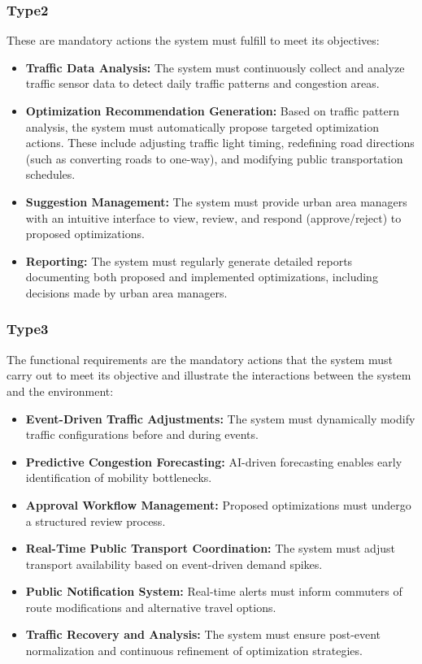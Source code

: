 \documentclass[a4paper,12pt]{article}
\begin{document}
\subsubsection*{Type2}
These are mandatory actions the system must fulfill to meet its objectives:
\begin{itemize}
    \item \textbf{Traffic Data Analysis:}  
    The system must continuously collect and analyze traffic sensor data to detect daily traffic patterns and congestion areas.

    \item \textbf{Optimization Recommendation Generation:}  
    Based on traffic pattern analysis, the system must automatically propose targeted optimization actions. These include adjusting traffic light timing, redefining road directions (such as converting roads to one-way), and modifying public transportation schedules.

    \item \textbf{Suggestion Management:}  
    The system must provide urban area managers with an intuitive interface to view, review, and respond (approve/reject) to proposed optimizations.

    \item \textbf{Reporting:}  
    The system must regularly generate detailed reports documenting both proposed and implemented optimizations, including decisions made by urban area managers.
\end{itemize}

\subsubsection*{Type3}
The functional requirements are the mandatory actions that the system must carry out to meet its objective and illustrate the interactions between the system and the environment:
\begin{itemize}
    \item \textbf{Event-Driven Traffic Adjustments:}  
    The system must dynamically modify traffic configurations before and during events.

    \item \textbf{Predictive Congestion Forecasting:}  
    AI-driven forecasting enables early identification of mobility bottlenecks.

    \item \textbf{Approval Workflow Management:}  
    Proposed optimizations must undergo a structured review process.

    \item \textbf{Real-Time Public Transport Coordination:}  
    The system must adjust transport availability based on event-driven demand spikes.

    \item \textbf{Public Notification System:}  
    Real-time alerts must inform commuters of route modifications and alternative travel options.

    \item \textbf{Traffic Recovery and Analysis:}  
    The system must ensure post-event normalization and continuous refinement of optimization strategies.
\end{itemize}
\end{document}
